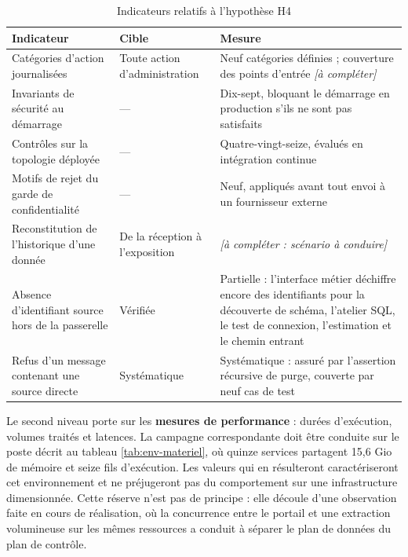 \begin{table}[htbp]
\centering
\caption{Indicateurs relatifs à l'hypothèse H4}
\label{tab:res-h4}
\small
\begin{tabularx}{\textwidth}{|p{4.6cm}|p{2.6cm}|X|}
\hline
\textbf{Indicateur} & \textbf{Cible} & \textbf{Mesure} \\ \hline

Catégories d'action journalisées & Toute action d'administration & Neuf catégories
définies ; couverture des points d'entrée \emph{[à compléter]} \\ \hline
Invariants de sécurité au démarrage & --- & Dix-sept, bloquant le démarrage en
production s'ils ne sont pas satisfaits \\ \hline
Contrôles sur la topologie déployée & --- & Quatre-vingt-seize, évalués en
intégration continue \\ \hline
Motifs de rejet du garde de confidentialité & --- & Neuf, appliqués avant tout
envoi à un fournisseur externe \\ \hline
Reconstitution de l'historique d'une donnée & De la réception à l'exposition &
\emph{[à compléter : scénario à conduire]} \\ \hline
Absence d'identifiant source hors de la passerelle & Vérifiée & Partielle :
l'interface métier déchiffre encore des identifiants pour la découverte de schéma,
l'atelier SQL, le test de connexion, l'estimation et le chemin entrant \\ \hline
Refus d'un message contenant une source directe & Systématique & Systématique :
assuré par l'assertion récursive de purge, couverte par neuf cas de test \\ \hline

\end{tabularx}
\end{table}



Le second niveau porte sur les \textbf{mesures de performance} : durées
d'exécution, volumes traités et latences. La campagne correspondante doit être
conduite sur le poste décrit au tableau \ref{tab:env-materiel}, où quinze services
partagent 15,6 Gio de mémoire et seize fils d'exécution. Les valeurs qui en
résulteront caractériseront cet environnement et ne préjugeront pas du
comportement sur une infrastructure dimensionnée. Cette réserve n'est pas de
principe : elle découle d'une observation faite en cours de réalisation, où la
concurrence entre le portail et une extraction volumineuse sur les mêmes
ressources a conduit à séparer le plan de données du plan de contrôle.


